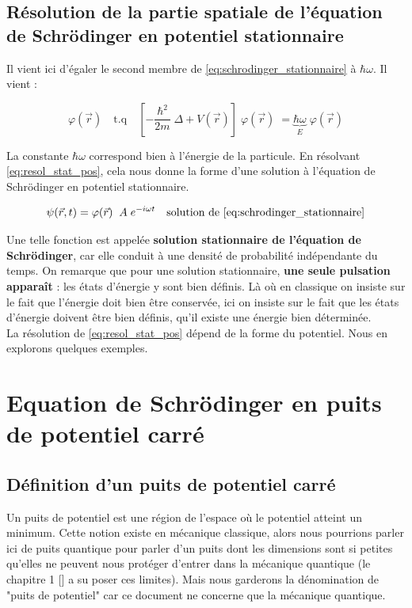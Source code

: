 \documentclass[12pt, a4paper]{book}
\begin{document}
\subsection{Résolution de la partie spatiale de l'équation de Schrödinger en potentiel stationnaire}
Il vient ici d'égaler le second membre de \eqref{eq:schrodinger_stationnaire} à $\hbar \omega$. Il vient :

\begin{equation} \label{eq:resol_stat_pos}
\varphi(\vec r) \quad \mathrm{t.q} \quad \left[-\dfrac{\hbar ^2}{2m} \; \Delta + V(\vec r) \right] \; \varphi(\vec r) \; = \underbrace{\hbar	\omega}_E \; \varphi(\vec r)
\end{equation}


La constante $\hbar \omega$ correspond bien à l'énergie de la particule. En résolvant \eqref{eq:resol_stat_pos}, cela nous donne la forme d'une solution à l'équation de Schrödinger en potentiel stationnaire.

\begin{equation}
\psi(\vec r, t) = \varphi(\vec r) \; \;  A \;e^{-i\omega t} \quad \text{solution de \eqref{eq:schrodinger_stationnaire}}
\end{equation}


Une telle fonction est appelée \textbf{solution stationnaire de l'équation de Schrödinger}, car elle conduit à une densité de probabilité indépendante du temps. On remarque que pour une solution stationnaire, \textbf{une seule pulsation apparaît} : les états d'énergie y sont bien définis. Là où en classique on insiste sur le fait que l'énergie doit bien être conservée, ici on insiste sur le fait que les états d'énergie doivent être bien définis, qu'il existe une énergie bien déterminée. \\

La résolution de \eqref{eq:resol_stat_pos} dépend de la forme du potentiel. Nous en explorons quelques exemples.


\section{Equation de Schrödinger en puits de potentiel carré}
\subsection{Définition d'un puits de potentiel carré}
Un puits de potentiel est une région de l'espace où le potentiel atteint un minimum. Cette notion existe en mécanique classique, alors nous pourrions parler ici de puits quantique pour parler d'un puits dont les dimensions sont si petites qu'elles ne peuvent nous protéger d'entrer dans la mécanique quantique (le chapitre 1 [] a su poser ces limites). Mais nous garderons la dénomination de "puits de potentiel" car ce document ne concerne que la mécanique quantique. \\
\end{document}
